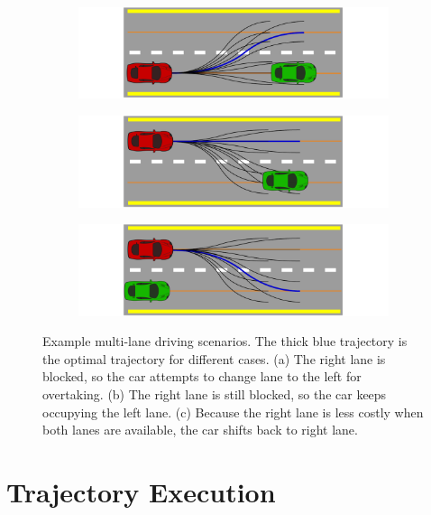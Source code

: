 \begin{figure}[h]
  \centering
  \begin{subfigure}[b]{1.0\linewidth}
    \includegraphics[width=\linewidth]{figures/frenet-shift-left-lane.pdf}
    \caption{}
  \end{subfigure}
  \begin{subfigure}[b]{1.0\linewidth}
    \includegraphics[width=\linewidth]{figures/frenet-keep-left-lane.pdf}
    \caption{}
  \end{subfigure}
  \begin{subfigure}[b]{1.0\linewidth}
    \includegraphics[width=\linewidth]{figures/frenet-shift-right-lane.pdf}
    \caption{}
  \end{subfigure}
  \caption[Example frenet frame optimal trajectories]{Example multi-lane
    driving scenarios. The thick blue trajectory is the optimal trajectory for
    different cases. (a) The right lane is blocked, so the car attempts to
    change lane to the left for overtaking. (b) The right lane is still
    blocked, so the car keeps occupying the left lane. (c) Because the right
    lane is less costly when both lanes are available, the car shifts back to
    right lane.}
  \label{figure:frenet-lanes}
\end{figure}

\section{Trajectory Execution}

